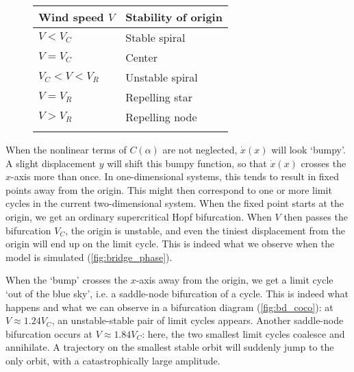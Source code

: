 \begin{figure}
\begin{minipage}[b]{0.6\textwidth}
\label{fig:eigencup}
\end{minipage}
\hfill
\begin{minipage}[b]{0.6\textwidth}
\centering
\begin{tabular}{@{}ll@{}} \toprule
Wind speed $V$    & Stability of origin \\
\midrule
$V < V_C$         & Stable spiral       \\[1em]
$V = V_C$         & Center              \\[1em]
$V_C < V < V_R $  & Unstable spiral     \\[1em]
$V = V_R$         & Repelling star      \\[1em]
$V > V_R$         & Repelling node      \\[1em]
\bottomrule
\vspace{36pt}
\end{tabular}
\label{tab:fp_class}
\vspace{14pt}
\end{minipage}
\end{figure}

When the nonlinear terms of $C(\alpha)$ are not neglected, $\dot{x}(x)$ will look `bumpy'. A slight displacement $y$ will shift this bumpy function, so that $\dot{x}(x)$ crosses the $x$-axis more than once. In one-dimensional systems, this tends to result in fixed points away from the origin. This might then correspond to one or more limit cycles in the current two-dimensional system. When the fixed point starts at the origin, we get an ordinary supercritical Hopf bifurcation. When $V$ then passes the bifurcation $V_C$, the origin is unstable, and even the tiniest displacement from the origin will end up on the limit cycle. This is indeed what we observe when the model is simulated (\cref{fig:bridge_phase}).

When the `bump' crosses the $x$-axis away from the origin, we get a limit cycle `out of the blue sky', i.e. a saddle-node bifurcation of a cycle. This is indeed what happens and what we can observe in a bifurcation diagram (\cref{fig:bd_coco}): at $V \approx 1.24 V_C$, an unstable-stable pair of limit cycles appears. Another saddle-node bifurcation occurs at $V \approx 1.84 V_C$: here, the two smallest limit cycles coalesce and annihilate. A trajectory on the smallest stable orbit will suddenly jump to the only orbit, with a catastrophically large amplitude. 

